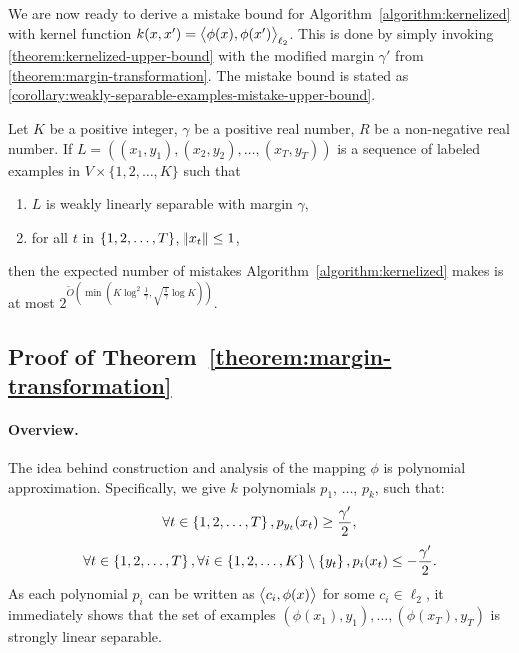 We are now ready to derive a mistake bound for Algorithm~\ref{algorithm:kernelized} with kernel
function $k(x,x') = \left\langle \phi(x), \phi(x') \right\rangle_{\ell_2}$. This is done by simply invoking
\autoref{theorem:kernelized-upper-bound} with the
modified margin $\gamma'$ from \autoref{theorem:margin-transformation}.
The mistake bound is stated as \autoref{corollary:weakly-separable-examples-mistake-upper-bound}.


\begin{corollary}
\label{corollary:weakly-separable-examples-mistake-upper-bound}
Let $K$ be a positive
integer, $\gamma$ be a positive real number, $R$ be a non-negative real number. If
$L = ((x_1, y_1), (x_2, y_2), \dots, (x_T, y_T))$ is a sequence of labeled examples in
$V \times \{1,2,\dots,K\}$ such that
\begin{enumerate}
  \item $L$ is weakly linearly separable with margin $\gamma$,
  \item for all $t$ in $\cbr{1,2,\ldots,T}$, $\norm{x_t} \le 1$,
\end{enumerate}
then the expected number of mistakes
Algorithm~\ref{algorithm:kernelized}
makes is at most $2^{\widetilde{O}(\min(K \log^2
\frac{1}{\gamma}, \sqrt{\frac{1}{\gamma}} \log K))}$.
\end{corollary}

\subsection{Proof of Theorem~\ref{theorem:margin-transformation}}
\label{sec:margin-trans}
\paragraph{Overview.} The idea behind construction and analysis of the mapping $\phi$ is polynomial
approximation. Specifically, we give $k$ polynomials $p_1$, $\ldots$, $p_k$,
such that:
\begin{equation}
  \forall t \in \cbr{1,2,\ldots,T}, p_{y_t}(x_t) \geq \frac{\gamma'}2,
  \label{eqn:poly-pos}
\end{equation}
\begin{equation}
  \forall t \in \cbr{1,2,\ldots,T}, \forall i \in \cbr{1,2,\ldots,K} \setminus \cbr{y_t}, p_i(x_t) \leq -\frac{\gamma'}2.
  \label{eqn:poly-neg}
\end{equation}
As each polynomial $p_i$ can be written as
$\left\langle c_i, \phi(x) \right\rangle$ for some $c_i \in \ell_2$, it immediately shows that
the set of examples $(\phi(x_1),y_1), \ldots, (\phi(x_T),y_T)$ is strongly linear separable.

